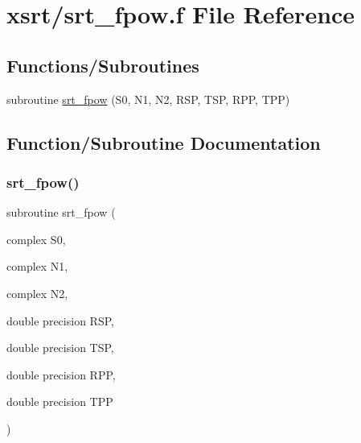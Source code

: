 \hypertarget{srt__fpow_8f}{}\section{xsrt/srt\+\_\+fpow.f File Reference}
\label{srt__fpow_8f}
\subsection*{Functions/\+Subroutines}
\begin{DoxyCompactItemize}
\item 
subroutine \hyperlink{srt__fpow_8f_a0a44f00e95509f21cc0d69f20cd6c940}{srt\+\_\+fpow} (S0, N1, N2, R\+SP, T\+SP, R\+PP, T\+PP)
\end{DoxyCompactItemize}


\subsection{Function/\+Subroutine Documentation}
\mbox{\label{srt__fpow_8f_a0a44f00e95509f21cc0d69f20cd6c940}} 
\subsubsection{\texorpdfstring{srt\+\_\+fpow()}{srt\_fpow()}}
{\footnotesize\ttfamily subroutine srt\+\_\+fpow (\begin{DoxyParamCaption}\item[{complex}]{S0,  }\item[{complex}]{N1,  }\item[{complex}]{N2,  }\item[{double precision}]{R\+SP,  }\item[{double precision}]{T\+SP,  }\item[{double precision}]{R\+PP,  }\item[{double precision}]{T\+PP }\end{DoxyParamCaption})}

